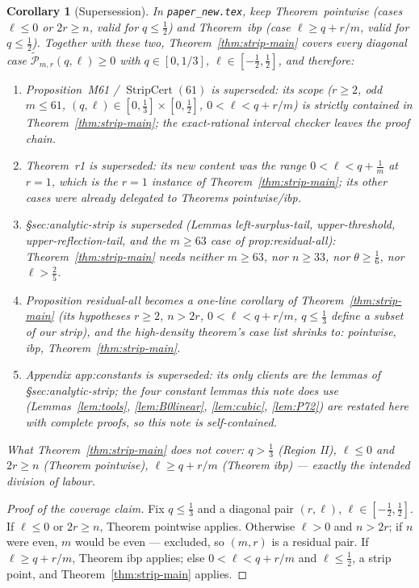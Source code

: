 \documentclass[11pt]{article}
\newtheorem{corollary}[theorem]{Corollary}
\theoremstyle{remark}
\theoremstyle{plain}
\theoremstyle{plain}
\newcommand{\wtP}{\widetilde{\mathcal P}}
\begin{document}
\begin{corollary}[Supersession]\label{cor:supersede}
In \texttt{paper\_new.tex}, keep Theorem~\textup{pointwise} (cases $\ell\le0$ or $2r\ge n$, valid for $q\le\tfrac12$) and Theorem~\textup{ibp} (case $\ell\ge q+r/m$, valid for $q\le\tfrac12$).  Together with these two, Theorem~\ref{thm:strip-main} covers every diagonal case $\wtP_{m,r}(q,\ell)\ge0$ with $q\in[0,1/3]$, $\ell\in[-\tfrac12,\tfrac12]$, and therefore:
\begin{enumerate}[label=\textup{(\alph*)}]
\item \emph{Proposition~M61 / $\operatorname{StripCert}(61)$ is superseded}: its scope ($r\ge2$, odd $m\le61$, $(q,\ell)\in[0,\tfrac13]\times[0,\tfrac12]$, $0<\ell<q+r/m$) is strictly contained in Theorem~\ref{thm:strip-main}; the exact-rational interval checker leaves the proof chain.
\item \emph{Theorem~r1 is superseded}: its new content was the range $0<\ell<q+\tfrac1m$ at $r=1$, which is the $r=1$ instance of Theorem~\ref{thm:strip-main}; its other cases were already delegated to Theorems pointwise/ibp.
\item \emph{\S sec:analytic-strip is superseded} (Lemmas left-surplus-tail, upper-threshold, upper-reflection-tail, and the $m\ge63$ case of prop:residual-all): Theorem~\ref{thm:strip-main} needs neither $m\ge63$, nor $n\ge33$, nor $\theta\ge\tfrac16$, nor $\ell>\tfrac25$.
\item \emph{Proposition residual-all becomes a one-line corollary} of Theorem~\ref{thm:strip-main} (its hypotheses $r\ge2$, $n>2r$, $0<\ell<q+r/m$, $q\le\tfrac13$ define a subset of our strip), and the high-density theorem's case list shrinks to: pointwise, ibp, Theorem~\ref{thm:strip-main}.
\item \emph{Appendix app:constants is superseded}: its only clients are the lemmas of \S sec:analytic-strip; the four constant lemmas this note does use (Lemmas~\ref{lem:tools}, \ref{lem:B0linear}, \ref{lem:cubic}, \ref{lem:P72}) are restated here with complete proofs, so this note is self-contained.
\end{enumerate}
What Theorem~\ref{thm:strip-main} does \emph{not} cover: $q>\tfrac13$ (Region II), $\ell\le0$ and $2r\ge n$ (Theorem pointwise), $\ell\ge q+r/m$ (Theorem ibp) --- exactly the intended division of labour.
\end{corollary}

\begin{proof}[Proof of the coverage claim]
Fix $q\le\tfrac13$ and a diagonal pair $(r,\ell)$, $\ell\in[-\tfrac12,\tfrac12]$.  If $\ell\le0$ or $2r\ge n$, Theorem pointwise applies.  Otherwise $\ell>0$ and $n>2r$; if $n$ were even, $m$ would be even --- excluded, so $(m,r)$ is a residual pair.  If $\ell\ge q+r/m$, Theorem ibp applies; else $0<\ell<q+r/m$ and $\ell\le\tfrac12$, a strip point, and Theorem~\ref{thm:strip-main} applies.
\end{proof}
\end{document}
